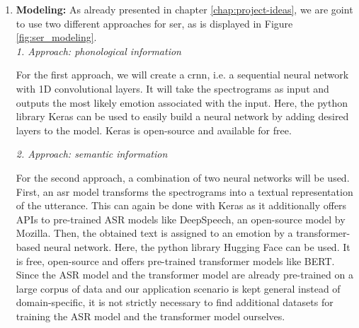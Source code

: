 \begin{enumerate}
\item \textbf{Modeling:} As already presented in chapter \ref{chap:project-ideas}, we are goint to use two different approaches for \acrshort{ser}, as is displayed in Figure \ref{fig:ser_modeling}.\\
\emph{1. Approach: phonological information}

For the first approach, we will create a \acrfull{crnn},  i.e. a sequential neural network with 1D convolutional layers. It will take the spectrograms as input and outputs the most likely emotion associated with the input. Here, the python library Keras can be used to easily build a neural network by adding desired layers to the model. Keras is open-source and available for free. 

\emph{2. Approach: semantic information}

For the second approach, a combination of two neural networks will be used. First, an \acrfull{asr} model transforms the spectrograms into a textual representation of the utterance. This can again be done with Keras as it additionally offers APIs to pre-trained ASR models like DeepSpeech, an open-source model by Mozilla.
Then, the obtained text is assigned to an emotion by a transformer-based neural network. Here, the python library Hugging Face can be used. It is free, open-source and offers pre-trained transformer models like BERT. 
Since the ASR model and the transformer model are already pre-trained on a large corpus of data and our application scenario is kept general instead of domain-specific, it is not strictly necessary to find additional datasets for training the ASR model and the transformer model ourselves. \\


\end{enumerate}
